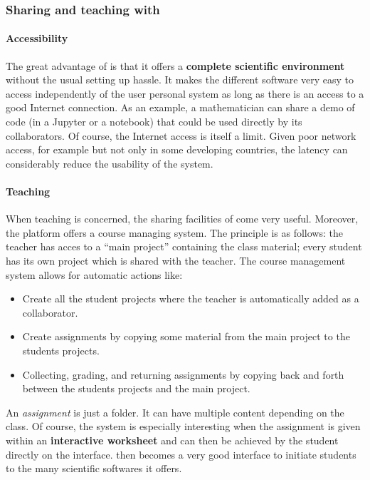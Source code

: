 \documentclass{deliverablereport}
\begin{document}
\subsubsection{Sharing and teaching with \SMC}

\paragraph{Accessibility}

The great advantage of \SMC is that it offers a \textbf{complete
  scientific environment} without the usual setting up hassle. It
makes the different software very easy to access independently of the
user personal system as long as there is an access to a good Internet
connection. As an example, a mathematician can share a demo of code (in
a Jupyter or a \Sage notebook) that could be used directly by its
collaborators. Of course, the Internet access is itself a limit.
Given poor network access, for example but not only in some developing
countries, the latency can considerably reduce the usability of the
system.

\paragraph{Teaching}

When teaching is concerned, the sharing facilities of \SMC come very
useful.  Moreover, the platform offers a course managing system. The
principle is as follows: the teacher has acces to a ``main project''
containing the class material; every student has its own project which
is shared with the teacher. The course management system allows for
automatic actions like:

\begin{itemize}
\item Create all the student projects where the teacher is
  automatically added as a collaborator.
\item Create assignments by copying some material from the main
  project to the students projects.
\item Collecting, grading, and returning assignments by copying back
  and forth between the students projects and the main project.
\end{itemize}

An \emph{assignment} is just a folder. It can have multiple content
depending on the class.  Of course, the system is especially
interesting when the assignment is given within an \textbf{interactive
  worksheet} and can then be achieved by the student directly on the
interface. \SMC then becomes a very good interface to initiate
students to the many scientific softwares it offers.
\end{document}
